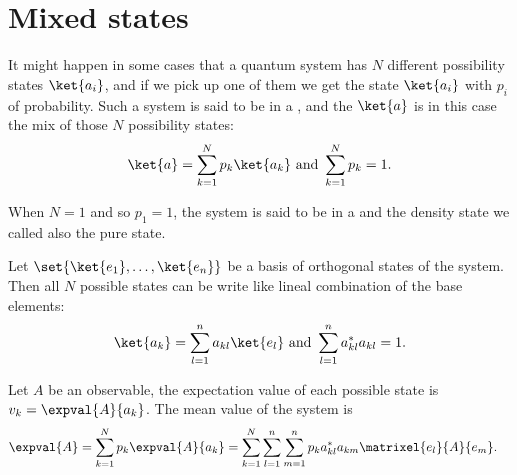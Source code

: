 
\section{Mixed states}
It might happen in some cases that a quantum system has $N$ different possibility states $\ket{a_i}$, and if we pick up one of them we get the state $\ket{a_i}$ with $p_i$ of probability.
Such a system is said to be in a , and the  $\ket{a}$ is in this case the mix of those $N$ possibility states:
\begin{equation}
    \label{eq:density-state}
    \ket{a} = \sum_{k=1}^N p_k\ket{a_k} \text{ and } \sum_{k=1}^N p_k=1.
\end{equation}

When $N=1$ and so $p_1=1$, the system is said to be in a  and the density state we called also the pure state.

Let $\set{\ket{e_1},\dots,\ket{e_n}}$ be a basis of orthogonal states of the system. Then all $N$ possible states can be write like lineal combination of the base elements:
\begin{equation}
    \label{eq:normal-state-base}
    \ket{a_k}=\sum_{l=1}^n a_{kl}\ket{e_l} \text{ and } \sum_{l=1}^n a^{*}_{kl}a_{kl} = 1.
\end{equation}

Let $A$ be an observable, the expectation value of each possible state is $v_k=\expval{A}{a_k}$.
The mean value of the system is
\begin{equation}
    \begin{split}
    \label{eq:density-expectation-value}
    \expval{A} & = \sum_{k=1}^N p_k\expval{A}{a_k} = \sum_{k=1}^N\sum_{l=1}^n\sum_{m=1}^n p_k a_{kl}^* a_{km}\matrixel{e_l}{A}{e_m}.
    \end{split}
\end{equation}


